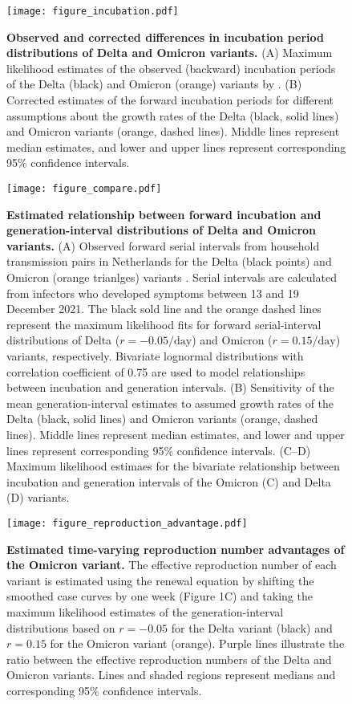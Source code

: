\documentclass[12pt]{article}
\begin{document}
\pagebreak

\begin{figure}[!th]
\texttt{[image: figure\_incubation.pdf]}
\caption{
\textbf{Observed and corrected differences in incubation period distributions of Delta and Omicron variants.}
(A) Maximum likelihood estimates of the observed (backward) incubation periods of the Delta (black) and Omicron (orange) variants by \cite{backer2021omicron}.
(B) Corrected estimates of the forward incubation periods for different assumptions about the growth rates of the Delta (black, solid lines) and Omicron variants (orange, dashed lines).
Middle lines represent median estimates, and lower and upper lines represent corresponding 95\% confidence intervals.
}
\end{figure}

\pagebreak

\begin{figure}[!th]
\texttt{[image: figure\_compare.pdf]}
\caption{
\textbf{Estimated relationship between forward incubation and generation-interval distributions of Delta and Omicron variants.}
(A) Observed forward serial intervals from household transmission pairs in Netherlands for the Delta (black points) and Omicron (orange trianlges) variants \citep{backer2021omicron}.
Serial intervals are calculated from infectors who developed symptoms between 13 and 19 December 2021.
The black sold line and the orange dashed lines represent the maximum likelihood fits for forward serial-interval distributions of Delta ($r=-0.05/\textrm{day}$) and Omicron ($r=0.15/\textrm{day}$) variants, respectively. 
Bivariate lognormal distributions with correlation coefficient of 0.75 are used to model relationships between incubation and generation intervals.
(B) Sensitivity of the mean generation-interval estimates to assumed growth rates of the Delta (black, solid lines) and Omicron variants (orange, dashed lines).
Middle lines represent median estimates, and lower and upper lines represent corresponding 95\% confidence intervals.
(C--D) Maximum likelihood estimaes for the bivariate relationship between incubation and generation intervals of the Omicron (C) and Delta (D) variants.
}
\end{figure}

\pagebreak

\begin{figure}[!th]
\texttt{[image: figure\_reproduction\_advantage.pdf]}
\caption{
\textbf{Estimated time-varying reproduction number advantages of the Omicron variant.}
The effective reproduction number of each variant is estimated using the renewal equation by shifting the smoothed case curves by one week (Figure 1C) and taking the maximum likelihood estimates of the generation-interval distributions based on $r=-0.05$ for the Delta variant (black) and $r=0.15$ for the Omicron variant (orange).
Purple lines illustrate the ratio between the effective reproduction numbers of the Delta and Omicron variants.
Lines and shaded regions represent medians and corresponding 95\% confidence intervals.
}
\end{figure}
\end{document}
